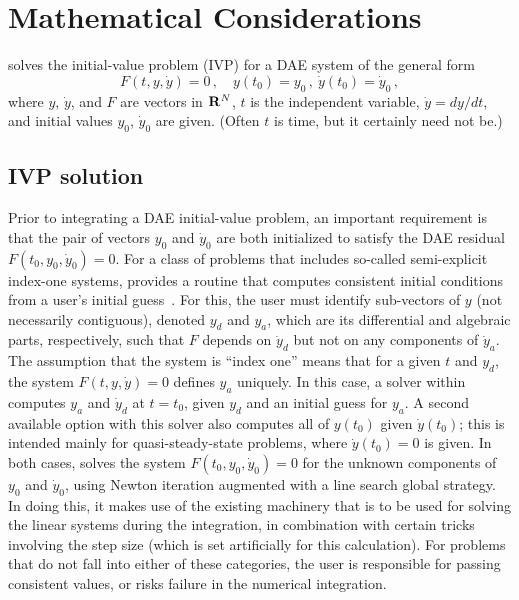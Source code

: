 \chapter{Mathematical Considerations}\label{s:math}

{\ida} solves the initial-value problem (IVP) for a DAE system of the
general form
\begin{equation}\label{e:DAE}
  F(t,y,\dot{y}) = 0 \, ,
  \quad y(t_0) = y_0 \, ,~ \dot{y}(t_0) = \dot{y}_0 \, ,
\end{equation}
where $y$, $\dot{y}$, and $F$ are vectors in ${\bf R}^N$, $t$ is the independent
variable, $\dot{y} = dy/dt$, and initial values $y_0$, $\dot{y}_0$ 
are given.  (Often $t$ is time, but it certainly need not be.)


\section{IVP solution}\label{ss:ivp_sol}

Prior to integrating a DAE initial-value problem, an important requirement 
is that the pair of vectors $y_0$ and $\dot{y}_0$ are both initialized to
satisfy the DAE residual $F(t_0,y_0, \dot{y}_0) = 0$.
For a class of problems that includes so-called
semi-explicit index-one systems, {\ida} provides a routine that computes
consistent initial conditions from a user's initial guess~\cite{BHP:98}.  
For this, the user must identify sub-vectors of $y$
(not necessarily contiguous), denoted $y_d$ and $y_a$, which are its
differential and algebraic parts, respectively, such that $F$ depends
on $\dot{y}_d$ but not on any components of $\dot{y}_a$.  The assumption that
the system is ``index one'' means that for a given $t$ and $y_d$, the
system $F(t,y,\dot{y}) = 0$ defines $y_a$ uniquely.  In this case, a solver
within {\ida} computes $y_a$ and $\dot{y}_d$ at $t = t_0$, given $y_d$ and an
initial guess for $y_a$.  A second available option with this solver
also computes all of $y(t_0)$ given $\dot{y}(t_0)$; this is intended mainly
for quasi-steady-state problems, where $\dot{y}(t_0) = 0$ is given.
In both cases, {\ida} solves the system $F(t_0,y_0, \dot{y}_0) = 0$ for the
unknown components of $y_0$ and $\dot{y}_0$, using Newton iteration
augmented with a line search global strategy.  In doing this, it makes
use of the existing machinery that is to be used for solving the
linear systems during the integration, in combination with certain
tricks involving the step size (which is set artificially for this
calculation).
For problems that do not fall into either of these categories, the
user is responsible for passing consistent values, or risks failure in
the numerical integration.

